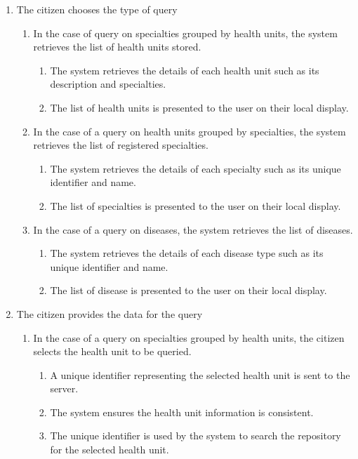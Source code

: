 \documentclass[11pt,twoside]{article}
\begin{document}
\begin{enumerate}
\item \label{uc01:exc01}The citizen chooses the type of query
\begin{enumerate}
\item  In the case of query on specialties grouped by health units, the
system retrieves the list of health units stored.
\begin{enumerate}
 \item The system retrieves the details of each health unit such as its
description and specialties.
\item The list of health units is presented to the user on their local
display. 
\end{enumerate}
\item In the case of a query on health units grouped by specialties, the
system retrieves the list of registered specialties. 
\begin{enumerate}
\item The system retrieves the details of each specialty such as its
unique identifier and name.
\item The list of specialties is presented to the user on their local
display.
\end{enumerate}
\item In the case of a query on diseases, the system retrieves the list of
diseases.
\begin{enumerate}
\item The system retrieves the details of each disease type such as
its unique identifier and name.
\item The list of disease is presented to the user on their local
display. 
\end{enumerate}
\end{enumerate}
\item \label{uc01:exc02} The citizen provides the data for the query
\begin{enumerate}
\item In the case of a query on specialties grouped by health units, the
citizen selects the health unit to be queried.
\begin{enumerate}
\item A unique identifier representing the selected health unit is sent
to the server.
\item The system ensures the health unit information is consistent.
\item The unique identifier is used by the system to search the
repository for the selected health unit.

\end{enumerate}
\end{enumerate}
\end{enumerate}
\end{document}
